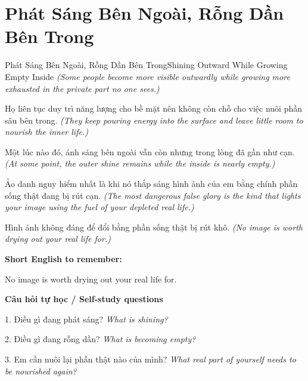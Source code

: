 \section{Phát Sáng Bên Ngoài, Rỗng Dần Bên Trong}
\begin{truyen}{Phát Sáng Bên Ngoài, Rỗng Dần Bên Trong}{Shining Outward While Growing Empty Inside}
\textit{(Some people become more visible outwardly while growing more exhausted in the private part no one sees.)}

Họ liên tục duy trì năng lượng cho bề mặt nên không còn chỗ cho việc nuôi phần sâu bên trong.
\textit{(They keep pouring energy into the surface and leave little room to nourish the inner life.)}

Một lúc nào đó, ánh sáng bên ngoài vẫn còn nhưng trong lòng đã gần như cạn.
\textit{(At some point, the outer shine remains while the inside is nearly empty.)}

Ảo danh nguy hiểm nhất là khi nó thắp sáng hình ảnh của em bằng chính phần sống thật đang bị rút cạn.
\textit{(The most dangerous false glory is the kind that lights your image using the fuel of your depleted real life.)}

\end{truyen}

\begin{baihoc}
Hình ảnh không đáng để đổi bằng phần sống thật bị rút khô.
\textit{(No image is worth drying out your real life for.)}
\end{baihoc}

\begin{ghinhoanh}
\textbf{Short English to remember:}

No image is worth drying out your real life for.

\end{ghinhoanh}

\begin{tuhocnhanh}
\textbf{Câu hỏi tự học / Self-study questions}

1. Điều gì đang phát sáng? \textit{What is shining?}

2. Điều gì đang rỗng dần? \textit{What is becoming empty?}

3. Em cần nuôi lại phần thật nào của mình? \textit{What real part of yourself needs to be nourished again?}
\end{tuhocnhanh}
\ngancach


